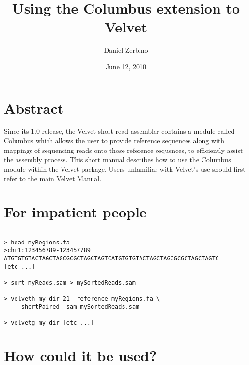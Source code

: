 \documentclass[12pt]{article}
\begin{document}
\title{Using the Columbus extension to Velvet}
\author{Daniel Zerbino}
\date{June 12, 2010}
\maketitle

\section*{Abstract}

Since its 1.0 release, the Velvet short-read assembler contains a module called Columbus which allows the user to provide reference sequences along with mappings of sequencing reads onto those reference sequences, to efficiently assist the assembly process. This short manual describes how to use the Columbus module within the Velvet package. Users unfamiliar with Velvet's use should first refer to the main Velvet Manual.

\section{For impatient people}

\begin{verbatim}

> head myRegions.fa
>chr1:123456789-123457789
ATGTGTGTACTAGCTAGCGCGCTAGCTAGTCATGTGTGTACTAGCTAGCGCGCTAGCTAGTC 
[etc ...]

> sort myReads.sam > mySortedReads.sam

> velveth my_dir 21 -reference myRegions.fa \
	-shortPaired -sam mySortedReads.sam

> velvetg my_dir [etc ...]

\end{verbatim}

\section{How could it be used?}
\end{document}
